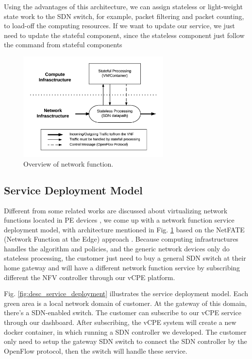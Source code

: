 \documentclass[journal]{IEEEtran}
\begin{document}
Using the advantages of this architecture, we can assign stateless or light-weight state work to the SDN switch, for example, packet filtering and packet counting, to load-off the computing resources. If we want to update our service, we just need to update the stateful component, since the stateless component just follow the command from stateful components

\begin{figure}[!t]
\centering
\includegraphics[width=3in]{./figures/desc_nfv_overview}
\caption{Overview of network function.}
\label{fig:desc_nfv_overview}
\end{figure}



\subsection{Service Deployment Model}
Different from some related works are discussed about virtualizing network functions located in PE devices \cite{vcpe-enhance}, we come up with a network function service deployment model, with architecture mentioned in Fig. \ref{fig:desc_nfv_overview} based on the NetFATE (Network Function at the Edge) approach \cite{netfate}. Because computing infrastructures handles the algorithm and policies, and the generic network devices only do stateless processing, the customer just need to buy a general SDN switch at their home gateway and will have a different network function service by subscribing different the NFV controller through our vCPE platform.

Fig. \ref{fig:desc_service_deployment} illustrates the service deployment model. Each green area is a local network domain of customer. At the gateway of this domain, there’s a SDN-enabled switch. The customer can subscribe to our vCPE service through our dashboard. After subscribing, the vCPE system will create a new docker container, in which running a SDN controller we developed. The customer only need to setup the gateway SDN switch to connect the SDN controller by the OpenFlow protocol, then the switch will handle these service.
\end{document}
